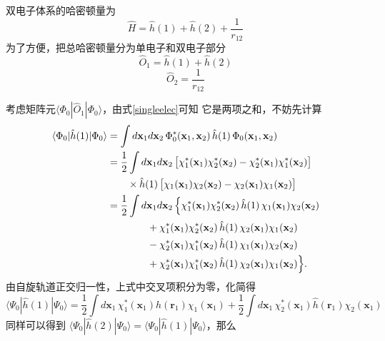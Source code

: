 \documentclass[fontset=none,12pt,a4paper]{ctexart}
\numberwithin{equation}{section}
\begin{document}
双电子体系的哈密顿量为
\begin{equation}
  \hat{H} = \hat{h}(1) + \hat{h}(2) + \frac{1}{r_{12}}
\end{equation}
为了方便，把总哈密顿量分为单电子和双电子部分
\begin{equation}
  \hat{O}_1 = \hat{h}(1) + \hat{h}(2)
\label{singleelec}
\end{equation}
\begin{equation}
  \hat{O}_2 = \frac{1}{r_{12}}
\end{equation}

考虑矩阵元$\langle\Phi_0|\hat{O}_1|\Phi_0\rangle$，由式\eqref{singleelec}可知
它是两项之和，不妨先计算
\begin{equation}
\begin{aligned}
  \langle\Phi_0|\hat{h}(1)|\Phi_0\rangle &=
   \int d\mathbf{x}_1 d\mathbf{x}_2\, \Phi_0^*(\mathbf{x}_1, \mathbf{x}_2)\, \hat{h}(1) \,\Phi_0(\mathbf{x}_1, \mathbf{x}_2) \\ 
  &=\frac12 \int d\mathbf{x}_1 d\mathbf{x}_2\,
   \bigl[\chi_1^*(\mathbf{x}_1)\chi_2^*(\mathbf{x}_2)-\chi_2^*(\mathbf{x}_1)\chi_1^*(\mathbf{x}_2)\bigr] \\ 
  &\qquad\times \hat{h}(1) \,
   \bigl[\chi_1(\mathbf{x}_1)\chi_2(\mathbf{x}_2)-\chi_2(\mathbf{x}_1)\chi_1(\mathbf{x}_2)\bigr] \\ 
  &=\frac12 \int d\mathbf{x}_1 d\mathbf{x}_2\,
    \Bigl\{ 
      \chi_1^*(\mathbf{x}_1)\chi_2^*(\mathbf{x}_2) \,\hat{h}(1) \,\chi_1(\mathbf{x}_1)\chi_2(\mathbf{x}_2) \\ 
  &\qquad\qquad + \chi_1^*(\mathbf{x}_1)\chi_2^*(\mathbf{x}_2) \,\hat{h}(1) \,\chi_2(\mathbf{x}_1)\chi_1(\mathbf{x}_2) \\ 
  &\qquad\qquad - \chi_2^*(\mathbf{x}_1)\chi_1^*(\mathbf{x}_2) \,\hat{h}(1) \,\chi_1(\mathbf{x}_1)\chi_2(\mathbf{x}_2) \\ 
  &\qquad\qquad + \chi_2^*(\mathbf{x}_1)\chi_1^*(\mathbf{x}_2) \,\hat{h}(1) \,\chi_2(\mathbf{x}_1)\chi_1(\mathbf{x}_2) 
    \Bigr\} .
\end{aligned}
\end{equation}
由自旋轨道正交归一性，上式中交叉项积分为零，化简得
\begin{equation}
  \langle\Psi_0|\hat{h}(1)|\Psi_0\rangle
  = \frac{1}{2} \int d\mathbf{x}_1\, \chi_1^*(\mathbf{x}_1)\hat{h}(\mathbf{r}_1)\chi_1(\mathbf{x}_1)
  + \frac{1}{2} \int d\mathbf{x}_1\, \chi_2^*(\mathbf{x}_1)\hat{h}(\mathbf{r}_1)\chi_2(\mathbf{x}_1)
\end{equation}
同样可以得到 $\langle\Psi_0|\hat{h}(2)|\Psi_0\rangle = \langle\Psi_0|\hat{h}(1)|\Psi_0\rangle$，那么
\end{document}
